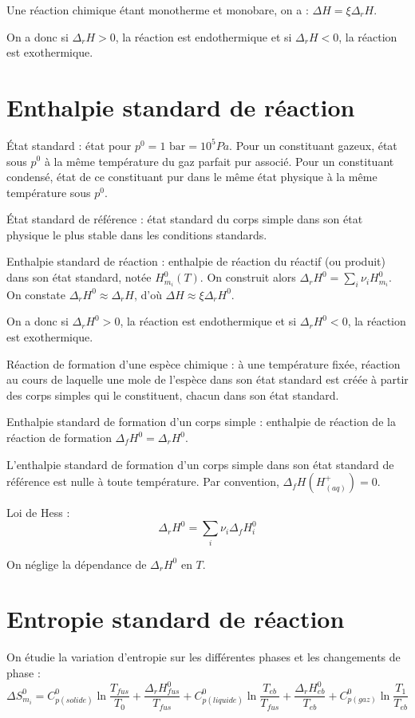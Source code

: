 \documentclass[12pt,a4paper] {article}
\begin{document}
Une réaction chimique étant monotherme et monobare, on a : $\Delta H = \xi \Delta_r H$.

On a donc si $\Delta_r H > 0$, la réaction est endothermique et si $\Delta_r H < 0$, la réaction est exothermique.

\section{Enthalpie standard de réaction}
État standard : état pour $p^0 = 1\text{ bar} = 10^5 Pa$. Pour un constituant gazeux, état sous $p^0$ à la même température du gaz parfait pur associé. Pour un constituant condensé, état de ce constituant pur dans le même état physique à la même température sous $p^0$.

État standard de référence : état standard du corps simple dans son état physique le plus stable dans les conditions standards.

Enthalpie standard de réaction : enthalpie de réaction du réactif (ou produit) dans son état standard, notée $H_{m_i}^0(T)$. On construit alors $\Delta_r H^0 = \sum_i \nu_i H_{m_i}^0$. On constate $\Delta_r H^0 \approx \Delta_r H$, d'où $\Delta H \approx \xi \Delta_r H^0$.

On a donc si $\Delta_r H^0 > 0$, la réaction est endothermique et si $\Delta_r H^0 < 0$, la réaction est exothermique.

Réaction de formation d'une espèce chimique : à une température fixée, réaction au cours de laquelle une mole de l'espèce dans son état standard est créée à partir des corps simples qui le constituent, chacun dans son état standard.

Enthalpie standard de formation d'un corps simple : enthalpie de réaction de la réaction de formation $\Delta_f H^0 = \Delta_r H^0$.

L'enthalpie standard de formation d'un corps simple dans son état standard de référence est nulle à toute température. Par convention, $\Delta_f H(H^+_{(aq)}) = 0$.

Loi de Hess : \[\Delta_r H^0 = \sum_i \nu_i \Delta_f H_i^0\]

On néglige la dépendance de $\Delta_r H^0$ en $T$.

\section{Entropie standard de réaction}
On étudie la variation d'entropie sur les différentes phases et les changements de phase :
\[ \Delta S_{m_i}^0 = C_{p(solide)}^0\ln\frac{T_{fus}}{T_0} + \frac{\Delta_r H_{fus}^0}{T_{fus}} + C_{p(liquide)}^0\ln\frac{T_{eb}}{T_{fus}} + \frac{\Delta_r H_{eb}^0}{T_{eb}} + C_{p(gaz)}^0\ln\frac{T_1}{T_{eb}} \]
\end{document}
